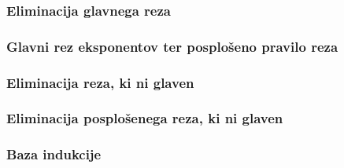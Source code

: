 \subsubsection{Eliminacija glavnega reza} \label{gl rez vezniki}


\subsubsection{Glavni rez eksponentov ter posplošeno pravilo reza}


\subsubsection{Eliminacija reza, ki ni glaven} \label{non principal}


\subsubsection{Eliminacija posplošenega reza, ki ni glaven}


\subsubsection{Baza indukcije}

